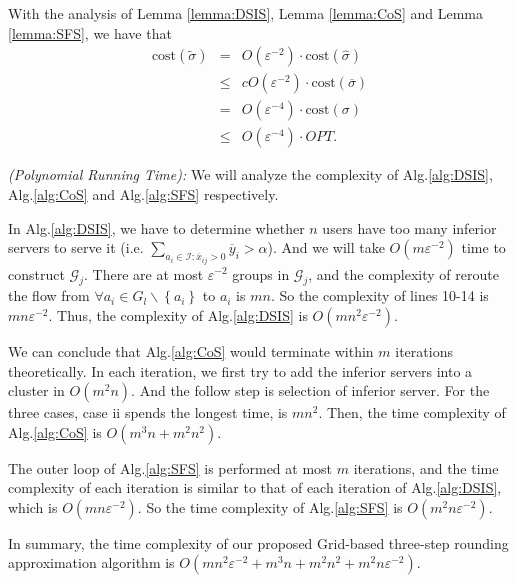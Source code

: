 \documentclass[journal]{IEEEtran}
\begin{document}
\begin{IEEEproof}
	With the analysis of Lemma \ref{lemma:DSIS}, Lemma \ref{lemma:CoS} and Lemma \ref{lemma:SFS}, we have that 
	\begin{eqnarray*}
		\text{cost}(\widetilde{\sigma}) &=&O(\varepsilon^{-2}) \cdot \text{cost}(\widehat{ \sigma })\\
		&\le&cO(\varepsilon^{-2}) \cdot \text{cost}(\overline{\sigma})\\
		&=& O(\varepsilon^{-4}) \cdot \text{cost}(\sigma)\\
		&\le& O(\varepsilon^{-4}) \cdot OPT.
	\end{eqnarray*} 
	
	\emph{(Polynomial Running Time):} We will analyze the complexity of Alg.\ref{alg:DSIS}, Alg.\ref{alg:CoS} and Alg.\ref{alg:SFS} respectively.
	
	
	In Alg.\ref{alg:DSIS}, we have to determine whether $n$ users have too many inferior servers to serve it (i.e. $\sum\nolimits_{{a_i} \in \mathcal{I}:{{\overline x }_{ij}} > 0} {{{\overline y }_i}}  > \alpha$). And we will take $O(m\varepsilon^{-2})$ time to construct $\mathcal{G}_j$. There are at most $\varepsilon^{-2}$ groups in $\mathcal{G}_j$, and the complexity of reroute the flow from $\forall a_i\in G_l\backslash \left\{a_i\right\}$ to $a_i$ is $mn$. So the complexity of lines 10-14 is $mn\varepsilon^{-2}$. Thus, the complexity of Alg.\ref{alg:DSIS} is $O( mn ^ 2 \varepsilon ^ { -2 })$.
	
	
	We can conclude that Alg.\ref{alg:CoS} would terminate within $m$ iterations theoretically. In each iteration, we first try to add the inferior servers into a cluster in $O(m^2n)$. And the follow step is selection of inferior server. For the three cases, case ii spends the longest time, is $mn^2$. Then, the time complexity of Alg.\ref{alg:CoS} is $O(m^3n+m^2n^2)$.
	
	
	The outer loop of Alg.\ref{alg:SFS} is performed at most $m$ iterations, and the time complexity of each iteration is similar to that of each iteration of Alg.\ref{alg:DSIS}, which is $O(mn\varepsilon^{-2})$. So the time complexity of Alg.\ref{alg:SFS} is $O(m^2n\varepsilon^{-2})$.
	
	
	In summary, the time complexity of our proposed Grid-based three-step rounding approximation algorithm is $O(mn^2\varepsilon^{-2} + m^3n + m^2n^2 + m^2n\varepsilon^{-2})$.
\end{IEEEproof}
\end{document}
